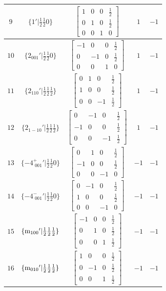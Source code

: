 \documentclass[fleqn,8pt]{jsarticle}
\begin{document}
\begin{longtable}{ccccc}
$ 9 $ & $ \{1{}'|\frac{1}{2} \frac{1}{2} 0\} $ & $ \begin{bmatrix} 1 & 0 & 0 & \frac{1}{2} \\ 0 & 1 & 0 & \frac{1}{2} \\ 0 & 0 & 1 & 0 \end{bmatrix} $ & $ 1 $ & $ -1 $ \\ \hline
$ 10 $ & $ \{2{}_{001}{}'|\frac{1}{2} \frac{1}{2} 0\} $ & $ \begin{bmatrix} -1 & 0 & 0 & \frac{1}{2} \\ 0 & -1 & 0 & \frac{1}{2} \\ 0 & 0 & 1 & 0 \end{bmatrix} $ & $ 1 $ & $ -1 $ \\ \hline
$ 11 $ & $ \{2{}_{110}{}'|\frac{1}{2} \frac{1}{2} \frac{1}{2}\} $ & $ \begin{bmatrix} 0 & 1 & 0 & \frac{1}{2} \\ 1 & 0 & 0 & \frac{1}{2} \\ 0 & 0 & -1 & \frac{1}{2} \end{bmatrix} $ & $ 1 $ & $ -1 $ \\ \hline
$ 12 $ & $ \{2{}_{1-10}{}'|\frac{1}{2} \frac{1}{2} \frac{1}{2}\} $ & $ \begin{bmatrix} 0 & -1 & 0 & \frac{1}{2} \\ -1 & 0 & 0 & \frac{1}{2} \\ 0 & 0 & -1 & \frac{1}{2} \end{bmatrix} $ & $ 1 $ & $ -1 $ \\ \hline
$ 13 $ & $ \{-4^{+}_{\,\,001}{}'|\frac{1}{2} \frac{1}{2} 0\} $ & $ \begin{bmatrix} 0 & 1 & 0 & \frac{1}{2} \\ -1 & 0 & 0 & \frac{1}{2} \\ 0 & 0 & -1 & 0 \end{bmatrix} $ & $ -1 $ & $ -1 $ \\ \hline
$ 14 $ & $ \{-4^{-}_{\,\,001}{}'|\frac{1}{2} \frac{1}{2} 0\} $ & $ \begin{bmatrix} 0 & -1 & 0 & \frac{1}{2} \\ 1 & 0 & 0 & \frac{1}{2} \\ 0 & 0 & -1 & 0 \end{bmatrix} $ & $ -1 $ & $ -1 $ \\ \hline
$ 15 $ & $ \{{\rm m}_{100}{}'|\frac{1}{2} \frac{1}{2} \frac{1}{2}\} $ & $ \begin{bmatrix} -1 & 0 & 0 & \frac{1}{2} \\ 0 & 1 & 0 & \frac{1}{2} \\ 0 & 0 & 1 & \frac{1}{2} \end{bmatrix} $ & $ -1 $ & $ -1 $ \\ \hline
$ 16 $ & $ \{{\rm m}_{010}{}'|\frac{1}{2} \frac{1}{2} \frac{1}{2}\} $ & $ \begin{bmatrix} 1 & 0 & 0 & \frac{1}{2} \\ 0 & -1 & 0 & \frac{1}{2} \\ 0 & 0 & 1 & \frac{1}{2} \end{bmatrix} $ & $ -1 $ & $ -1 $ \\
\end{longtable}
\end{document}
